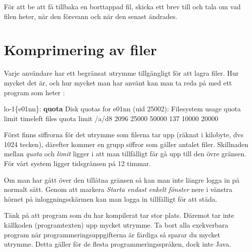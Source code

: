 \documentclass[a4paper,twocolumn]{book}
\begin{document}
För att be att få tillbaka en borttappad fil, skicka ett brev till
 och tala om vad filen heter, när den försvann och
när den senast ändrades.

\section{Komprimering av filer}

Varje användare har ett begränsat utrymme tillgängligt för att lagra
filer. Hur mycket det är, och hur mycket man har använt kan man ta
reda på med ett program som heter :
\begin{example}
  \scriptsize
  lo-1\{e01nn\}: \textbf{quota}
  Disk quotas for e01nn (uid 25002):
  Filesystem usage quota limit timeleft files quota limit
  /a/d8       2096 25000 50000            137 10000 20000
\end{example}
Först finns siffrorna för det utrymme som filerna tar upp (räknat i
kilobyte, dvs 1024 tecken), därefter kommer en grupp siffror som
gäller antalet filer. Skillnaden mellan \emph{quota} och \emph{limit}
ligger i att man tillfälligt får gå upp till den övre gränsen. För
vårt system ligger tidsgränsen på 12 timmar.

Om man har gått över den tillåtna gränsen så kan man inte längre logga
in på normalt sätt. Genom att markera \emph{Starta
  endast enkelt fönster} nere i vänstra hörnet på inloggningsskärmen
kan man logga in tillfälligt för att städa.

Tänk på att program som du har kompilerat tar stor plats. Däremot tar
inte källkoden (programtexten) upp mycket utrymme. Ta bort alla
exekverbara program när programmeringsuppgifterna är färdiga så sparar
du mycket utrymme. Detta gäller för de flesta programmeringsspråken,
dock inte Java.
\end{document}
